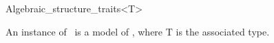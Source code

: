 \begin{ccRefClass}{Algebraic_structure_traits<T>}

\ccDefinition

An instance of \ccClassTemplateName\ is a model of , where {\sc T} is the associated type. 


\ccSeeAlso
{}\\

\end{ccRefClass} 